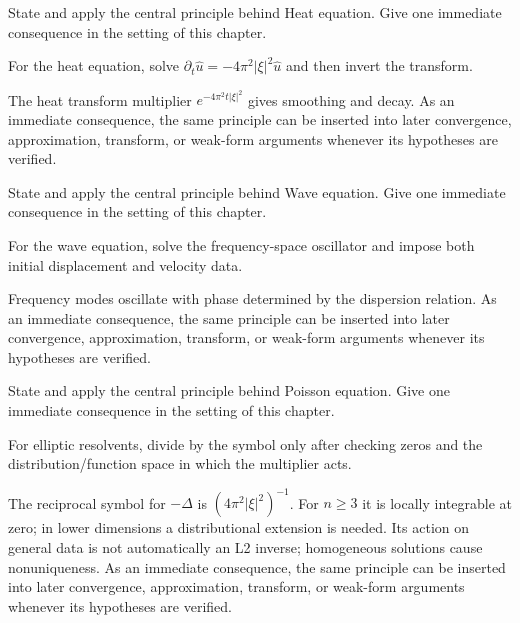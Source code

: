 \begin{exercise}\label{exr:iii28-03}
State and apply the central principle behind Heat equation. Give one immediate consequence in the setting of this chapter.
\end{exercise}
\begin{hint}
For the heat equation, solve \(\partial_t\widehat u=-4\pi^2|\xi|^2\widehat u\) and then invert the transform.
\end{hint}
\begin{solution}
The heat transform multiplier $e^{-4\pi^2t|\xi|^2}$ gives smoothing and decay. As an immediate consequence, the same principle can be inserted into later convergence, approximation, transform, or weak-form arguments whenever its hypotheses are verified.
\end{solution}

\begin{exercise}\label{exr:iii28-04}
State and apply the central principle behind Wave equation. Give one immediate consequence in the setting of this chapter.
\end{exercise}
\begin{hint}
For the wave equation, solve the frequency-space oscillator and impose both initial displacement and velocity data.
\end{hint}
\begin{solution}
Frequency modes oscillate with phase determined by the dispersion relation. As an immediate consequence, the same principle can be inserted into later convergence, approximation, transform, or weak-form arguments whenever its hypotheses are verified.
\end{solution}

\begin{exercise}\label{exr:iii28-05}
State and apply the central principle behind Poisson equation. Give one immediate consequence in the setting of this chapter.
\end{exercise}
\begin{hint}
For elliptic resolvents, divide by the symbol only after checking zeros and the distribution/function space in which the multiplier acts.
\end{hint}
\begin{solution}
The reciprocal symbol for $-\Delta$ is $(4\pi^2|\xi|^2)^{-1}$. For $n\ge3$ it is locally integrable at zero; in lower dimensions a distributional extension is needed. Its action on general data is not automatically an L2 inverse; homogeneous solutions cause nonuniqueness. As an immediate consequence, the same principle can be inserted into later convergence, approximation, transform, or weak-form arguments whenever its hypotheses are verified.
\end{solution}

